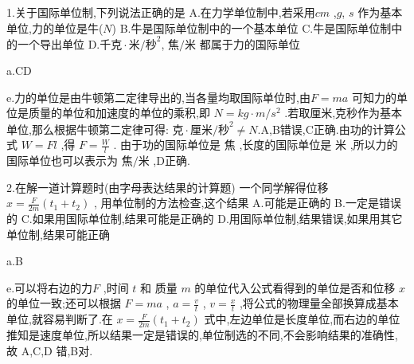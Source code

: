 \begin{selection}
  1.关于国际单位制,下列说法正确的是
  A.在力学单位制中,若采用$cm$ ,$g$, $s$ 作为基本单位,力的单位是牛($N$)
  B.牛是国际单位制中的一个基本单位
  C.牛是国际单位制中的一个导出单位
  D.$\mbox{千克}\cdot \mbox{米}/\mbox{秒}^2$, $\mbox{焦}/\mbox{米}$ 都属于力的国际单位

  a.CD

  e.力的单位是由牛顿第二定律导出的,当各量均取国际单位时,由$F=ma$ 可知力的单位是质量的单位和加速度的单位的乘积,即 $N=kg\cdot m/s^2$ .若取厘米,克秒作为基本单位,那么根据牛顿第二定律可得: $\mbox{克}\cdot \mbox{厘米}/\mbox{秒}^2 \neq N$.A,B错误,C正确.由功的计算公式 $W=Fl$ ,得 $F=\frac{W}{l}$ . 由于功的国际单位是 $\mbox{焦} $ ,长度的国际单位是 $\mbox{米}$ ,所以力的国际单位也可以表示为 $\mbox{焦} / \mbox{米} $ ,D正确.
  
  2.在解一道计算题时(由字母表达结果的计算题) 一个同学解得位移 $x=\frac{F}{2m}(t_1+t_2)$ , 用单位制的方法检查,这个结果
 A.可能是正确的
 B.一定是错误的
 C.如果用国际单位制,结果可能是正确的
 D.用国际单位制,结果错误,如果用其它单位制,结果可能正确

 a.B

 e.可以将右边的力$F$ ,时间 $t$ 和 质量 $m$ 的单位代入公式看得到的单位是否和位移 $x$ 的单位一致;还可以根据 $F=ma$ , $a=\frac{v}{t} $ , $ v= \frac{x}{t} $ ,将公式的物理量全部换算成基本单位,就容易判断了.在 $x=\frac{F}{2m} (t_1+t_2)$ 式中,左边单位是长度单位,而右边的单位推知是速度单位,所以结果一定是错误的,单位制选的不同,不会影响结果的准确性,故 A,C,D 错,B对.


\end{selection}
